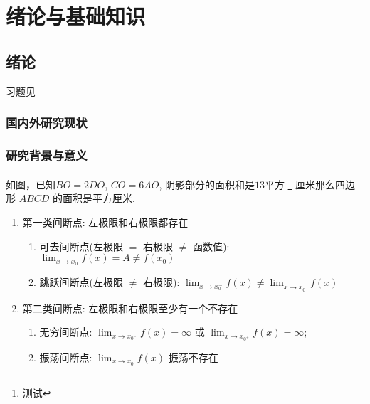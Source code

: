 \documentclass{USTBBook}
\begin{document}
\makeCover

\frontmatter
\pagestyle{fancy}

\setcounter{page}{0}
\cleardoublepage
{}


\tableofcontents

\mainmatter

\part{绪论与基础知识}

\chapter{绪论}

\begin{flushright}
  \faHandPointRight 习题见 
\end{flushright}

\section{国内外研究现状}

\zhlipsum[1]

\section*{研究背景与意义}


\zhlipsum[2]

\begin{question*}
  \taskGrade
  如图，已知$BO=2DO$, $CO=6AO$, 阴影部分的面积和是$13$平方 \footnote{测试}
  厘米那么四边形 $ABCD$ 的面积是\fillin[]平方厘米.
\end{question*}

\begin{enumerate}
  \item 第一类间断点: 左极限和右极限都存在
        \begin{enumerate}
          \item 可去间断点(左极限 $=$ 右极限 $\neq$ 函数值):
                $\lim _{x \to x_{0}}f(x)=A\neq f(x_{0})$
          \item 跳跃间断点(左极限 $\neq$ 右极限): $\lim _{x \to x_{0}^{-}}f(x) \neq \lim _{x \to x_{0}^{+}}f(x)$
        \end{enumerate}
  \item 第二类间断点: 左极限和右极限至少有一个不存在
        \begin{enumerate}
          \item 无穷间断点: $\lim _{x \to x_{0^-}}f(x)=\infty$ 或 $\lim _{x \to x_{0^+}}f(x)=\infty$;
          \item 振荡间断点: $\lim _{x \to x_{0}}f(x)$ 振荡不存在
        \end{enumerate}
\end{enumerate}
\end{document}
